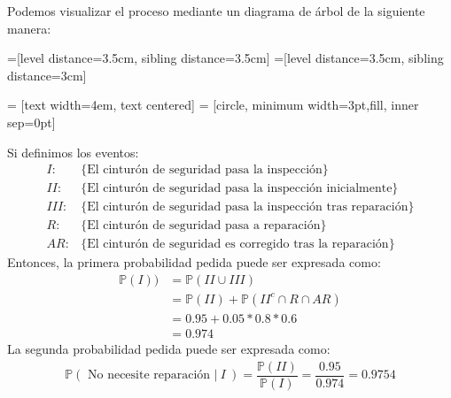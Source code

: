 \begin{solution}
Podemos visualizar el proceso mediante un diagrama de árbol de la siguiente manera:
\begin{center}
=[level distance=3.5cm, sibling distance=3.5cm]
=[level distance=3.5cm, sibling distance=3cm]

 = [text width=4em, text centered]
 = [circle, minimum width=3pt,fill, inner sep=0pt]

\end{center}
Si definimos los eventos:
\begin{align*}
I:&\{\text{El cinturón de seguridad pasa la inspección}\} \\
II:&\{\text{El cinturón de seguridad pasa la inspección inicialmente}\} \\
III:&\{\text{El cinturón de seguridad pasa la inspección tras reparación}\} \\
R:&\{\text{El cinturón de seguridad pasa a reparación}\}\\
AR:&\{\text{El cinturón de seguridad es corregido tras la reparación}\}
\end{align*}
Entonces, la primera probabilidad pedida puede ser expresada como:
\begin{align*}
\mathbb{P}(I))&=\mathbb{P}( II \cup III)\\
&= \mathbb{P}(II) + \mathbb{P}( II^c \cap R \cap AR)\\
&= 0.95 + 0.05*0.8*0.6\\
&= 0.974
\end{align*}
La segunda probabilidad pedida puede ser expresada como:
\begin{align*}
\mathbb{P}(\text{ No necesite reparación }| \ I \ )= \dfrac{\mathbb{P}(II)}{\mathbb{P}(I)}=\dfrac{0.95}{0.974}=0.9754
\end{align*}
\end{solution}